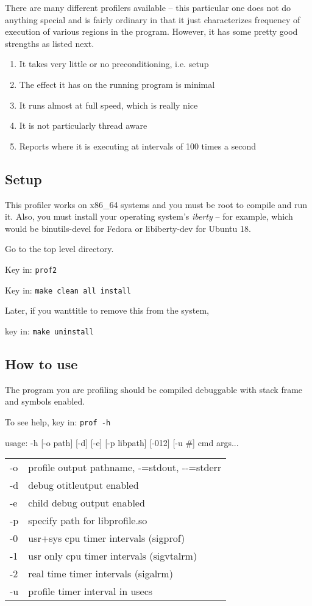 There are many different profilers available -- this particular one does not do anything special and is fairly ordinary in that it just characterizes frequency of execution of various regions in the program. However, it has some pretty good strengths as listed next.

\begin{enumerate}[nosep]
	\item It takes very little or no preconditioning, i.e. setup
	\item The effect it has on the running program is minimal
	\item It runs almost at full speed, which is really nice
	\item It is not particularly thread aware
	\item Reports where it is executing at intervals of 100 times a second
\end{enumerate}

\subsection{Setup}
\label{sub:setup}

This profiler works on x86\_64 systems and you must be root to compile and run it. Also, you must install your operating system's \textit{iberty} -- for example, which would be binutils-devel for Fedora or libiberty-dev for Ubuntu 18.

Go to the top level \CGG{} directory.

Key in: \qquad \texttt{prof2}

Key in: \qquad \texttt{make clean all install}

Later, if you wanttitle to remove this from the system,

key in: \qquad \texttt{make uninstall}

\subsection{How to use}
\label{sub:how_to_use}

The program you are profiling should be compiled debuggable with stack frame and symbols enabled.

To see help, key in: \qquad \texttt{prof -h}

usage: -h [-o path] [-d] [-e] [-p libpath] [-012] [-u \#] cmd args...

\hspace{2em}
\begin{tabular}{@{}ll}
	-o & profile output pathname, -=stdout, -{}-=stderr\\
	-d & debug otitleutput enabled\\
	-e & child debug output enabled\\
	-p & specify path for libprofile.so\\
	-0 & usr+sys cpu timer intervals (sigprof)\\
	-1 & usr only cpu timer intervals (sigvtalrm)\\
	-2 & real time timer intervals (sigalrm)\\
	-u & profile timer interval in usecs\\
\end{tabular}

